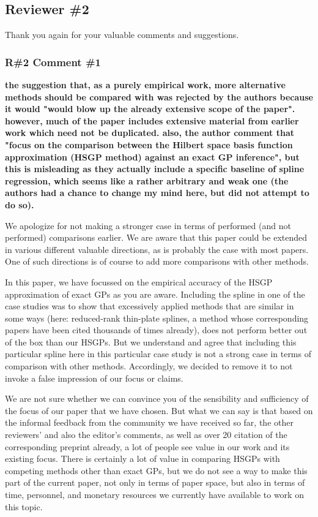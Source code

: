 \documentclass[11pt]{report}
\begin{document}
\subsection*{Reviewer \#2}

Thank you again for your valuable comments and suggestions.

\subsubsection*{R\#2 Comment \#1}

\textbf{the suggestion that, as a purely empirical work, more alternative methods should be compared with was rejected by the authors because it would "would blow up the already extensive scope of the paper". however, much of the paper includes extensive material from earlier work which need not be duplicated. also, the author comment that "focus on the comparison between the Hilbert space basis function approximation (HSGP method) against an exact GP inference", but this is misleading as they actually include a specific baseline of spline regression, which seems like a rather arbitrary and weak one (the authors had a chance to change my mind here, but did not attempt to do so).}

We apologize for not making a stronger case in terms of performed (and not performed) comparisons earlier. We are aware that this paper could be extended in various different valuable directions, as is probably the case with most papers. One of such directions is of course to add more comparisons with other methods. 

In this paper, we have focussed on the empirical accuracy of the HSGP approximation of exact GPs as you are aware. Including the spline in one of the case studies was to show that excessively applied methods that are similar in some ways (here: reduced-rank thin-plate splines, a method whose corresponding papers have been cited thousands of times already), does not perform better out of the box than our HSGPs. But we understand and agree that including this particular spline here in this particular case study is not a strong case in terms of comparison with other methods. Accordingly, we decided to remove it to not invoke a false impression of our focus or claims. 

We are not sure whether we can convince you of the sensibility and sufficiency of the focus of our paper that we have chosen. But what we can say is that based on the informal feedback from the community we have received so far, the other reviewers' and also the editor's comments, as well as over 20 citation of the corresponding preprint already, a lot of people see value in our work and its existing focus. There is certainly a lot of value in comparing HSGPs with competing methods other than exact GPs, but we do not see a way to make this part of the current paper, not only in terms of paper space, but also in terms of time, personnel, and monetary resources we currently have available to work on this topic.
\end{document}
